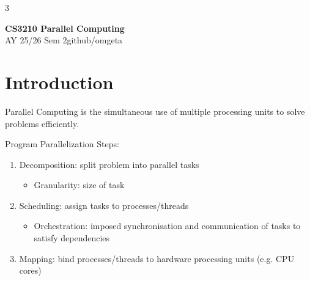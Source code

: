 \documentclass[12pt, a4paper]{article}
\newcommand{\mytitle}{CS3210 Parallel Computing}
\newcommand{\myauthor}{github/omgeta}
\newcommand{\mydate}{AY 25/26 Sem 2}
\begin{document}
\raggedright
\footnotesize
\begin{multicols*}{3}
\setlength{\premulticols}{1pt}
\setlength{\postmulticols}{1pt}
\setlength{\multicolsep}{1pt}
\setlength{\columnsep}{2pt}

{\normalsize{\textbf{\mytitle}}}\\
{\footnotesize{\mydate\hspace{2pt}\textemdash\hspace{2pt}\myauthor}}
\section{Introduction}
Parallel Computing is the simultaneous use of multiple processing units to solve problems efficiently. 

Program Parallelization Steps:
\begin{enumerate}[\roman*.]
  \item Decomposition: split problem into parallel tasks
    \begin{itemize}[leftmargin=*]\vspace{2pt}
      \item Granularity: size of task
    \end{itemize}
  \item Scheduling: assign tasks to processes/threads
    \begin{itemize}[leftmargin=*]\vspace{2pt}
      \item Orchestration: imposed synchronisation and communication of tasks to satisfy dependencies
    \end{itemize}
  \item Mapping: bind processes/threads to hardware processing units (e.g. CPU cores)
\end{enumerate}


\end{multicols*}
\end{document}
